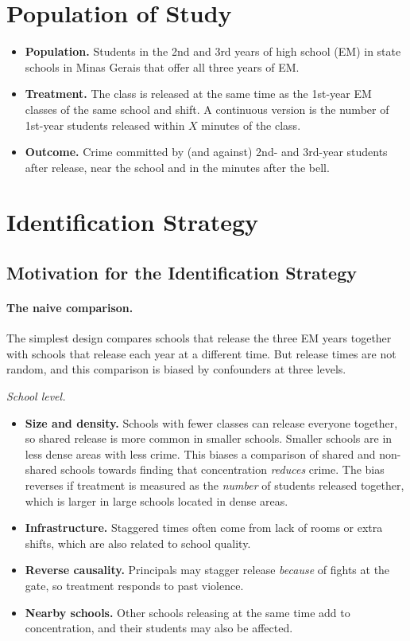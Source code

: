 \section{Population of Study}

\begin{itemize}
  \item \textbf{Population.} Students in the 2nd and 3rd years of high school
        (EM) in state schools in Minas Gerais that offer all three years of EM.
  \item \textbf{Treatment.} The class is released at the same time as the
        1st-year EM classes of the same school and shift. A continuous version
        is the number of 1st-year students released within $X$ minutes of the
        class.
  \item \textbf{Outcome.} Crime committed by (and against) 2nd- and 3rd-year
        students after release, near the school and in the minutes after the
        bell.
\end{itemize}

\section{Identification Strategy}

\subsection{Motivation for the Identification Strategy}

\paragraph{The naive comparison.} The simplest design compares schools that
release the three EM years together with schools that release each year at a
different time. But release times are not random, and this comparison is
biased by confounders at three levels.

\emph{School level.}
\begin{itemize}
  \item \textbf{Size and density.} Schools with fewer classes can release
        everyone together, so shared release is more common in smaller schools.
        Smaller schools are in less dense areas with less crime. This biases a
        comparison of shared and non-shared schools towards finding that
        concentration \emph{reduces} crime. The bias reverses if treatment is
        measured as the \emph{number} of students released together, which is
        larger in large schools located in dense areas.
  \item \textbf{Infrastructure.} Staggered times often come from lack of rooms
        or extra shifts, which are also related to school quality.
  \item \textbf{Reverse causality.} Principals may stagger release
        \emph{because} of fights at the gate, so treatment responds to past
        violence.
  \item \textbf{Nearby schools.} Other schools releasing at the same time add
        to concentration, and their students may also be affected.
\end{itemize}


